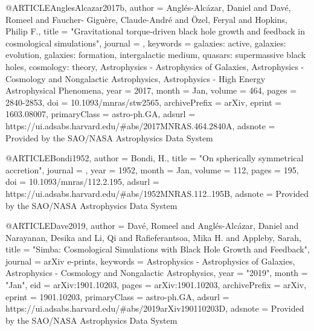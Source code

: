 @ARTICLE{AnglesAlcazar2017b,
       author = {{Angl{\'e}s-Alc{\'a}zar}, Daniel and {Dav{\'e}}, Romeel and {Faucher-
        Gigu{\`e}re}, Claude-Andr{\'e} and {{\"O}zel}, Feryal and
        {Hopkins}, Philip F.},
        title = "{Gravitational torque-driven black hole growth and feedback in cosmological simulations}",
      journal = {\mnras},
     keywords = {galaxies: active, galaxies: evolution, galaxies: formation, intergalactic medium, quasars: supermassive black holes, cosmology: theory, Astrophysics - Astrophysics of Galaxies, Astrophysics - Cosmology and Nongalactic Astrophysics, Astrophysics - High Energy Astrophysical Phenomena},
         year = 2017,
        month = Jan,
       volume = {464},
        pages = {2840-2853},
          doi = {10.1093/mnras/stw2565},
archivePrefix = {arXiv},
       eprint = {1603.08007},
 primaryClass = {astro-ph.GA},
       adsurl = {https://ui.adsabs.harvard.edu/\#abs/2017MNRAS.464.2840A},
      adsnote = {Provided by the SAO/NASA Astrophysics Data System}
}

@ARTICLE{Bondi1952,
       author = {{Bondi}, H.},
        title = "{On spherically symmetrical accretion}",
      journal = {\mnras},
         year = 1952,
        month = Jan,
       volume = {112},
        pages = {195},
          doi = {10.1093/mnras/112.2.195},
       adsurl = {https://ui.adsabs.harvard.edu/\#abs/1952MNRAS.112..195B},
      adsnote = {Provided by the SAO/NASA Astrophysics Data System}
}

@ARTICLE{Dave2019,
       author = {{Dav{\'e}}, Romeel and {Angl{\'e}s-Alc{\'a}zar}, Daniel and
         {Narayanan}, Desika and {Li}, Qi and {Rafieferantsoa}, Mika H. and
         {Appleby}, Sarah},
        title = "{Simba: Cosmological Simulations with Black Hole Growth and Feedback}",
      journal = {arXiv e-prints},
     keywords = {Astrophysics - Astrophysics of Galaxies, Astrophysics - Cosmology and Nongalactic Astrophysics},
         year = "2019",
        month = "Jan",
          eid = {arXiv:1901.10203},
        pages = {arXiv:1901.10203},
archivePrefix = {arXiv},
       eprint = {1901.10203},
 primaryClass = {astro-ph.GA},
       adsurl = {https://ui.adsabs.harvard.edu/\#abs/2019arXiv190110203D},
      adsnote = {Provided by the SAO/NASA Astrophysics Data System}
}

